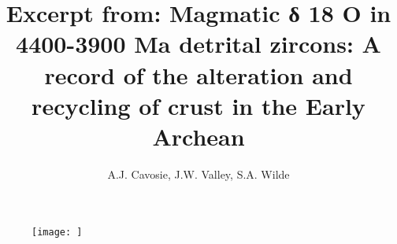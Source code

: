 \documentclass[]{article}
\begin{document}
	
	\title{Excerpt from: Magmatic δ 18 O in 4400-3900 Ma detrital zircons: A
		record of the alteration and recycling of crust in the Early Archean} %
	
	\author{A.J. Cavosie, J.W. Valley, S.A. Wilde} %
	
	\date{} %
	
	\maketitle  %
	
	\setcounter{section}{1} %
	\section{}
	
	
	\begin{figure}[h!]
		\texttt{[image: ]} %
		\caption{}  %
		
	\end{figure}
	
\end{document}

